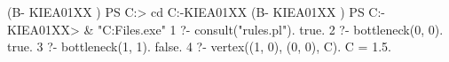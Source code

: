 (B- KIEA01XX ) PS C:\Users\USERNAME> cd C:\Users\USERNAME\Downloads\B-KIEA01XX
(B- KIEA01XX ) PS C:\Users\USERNAME\Downloads\B-KIEA01XX> & "C:\Program Files\swipl\bin\swipl.exe"
1 ?- consult("rules.pl").
true.
2 ?- bottleneck(0, 0).
true.
3 ?- bottleneck(1, 1).
false.
4 ?- vertex((1, 0), (0, 0), C).
C = 1.5.